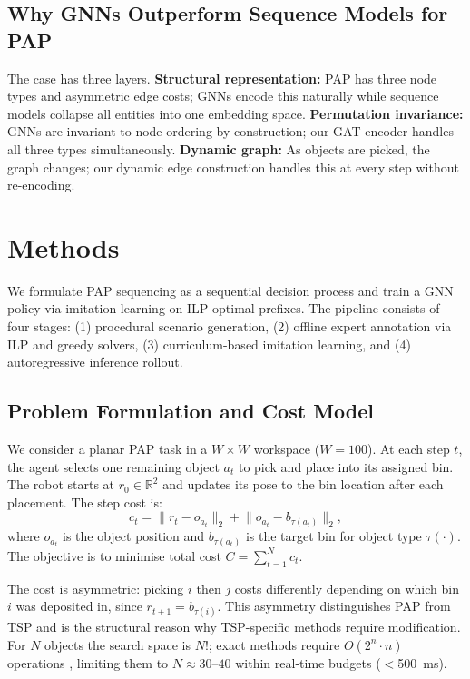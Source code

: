 \documentclass[conference]{IEEEtran}
\begin{document}
\subsection{Why GNNs Outperform Sequence Models for PAP}

The case has three layers. \textbf{Structural representation:} PAP has three node types and asymmetric edge costs; GNNs encode this naturally while sequence models collapse all entities into one embedding space. \textbf{Permutation invariance:} GNNs are invariant to node ordering by construction; our GAT encoder handles all three types simultaneously. \textbf{Dynamic graph:} As objects are picked, the graph changes; our dynamic edge construction handles this at every step without re-encoding.

\section{Methods}\label{sec:methods}

We formulate PAP sequencing as a sequential decision process and train a GNN policy via imitation learning on ILP-optimal prefixes. The pipeline consists of four stages: (1) procedural scenario generation, (2) offline expert annotation via ILP and greedy solvers, (3) curriculum-based imitation learning, and (4) autoregressive inference rollout.

\subsection{Problem Formulation and Cost Model}

We consider a planar PAP task in a $W \times W$ workspace ($W=100$). At each step $t$, the agent selects one remaining object $a_t$ to pick and place into its assigned bin. The robot starts at $r_0 \in \mathbb{R}^2$ and updates its pose to the bin location after each placement. The step cost is:
\begin{equation}
c_t = \lVert r_t - o_{a_t} \rVert_2 + \lVert o_{a_t} - b_{\tau(a_t)} \rVert_2,
\end{equation}
where $o_{a_t}$ is the object position and $b_{\tau(a_t)}$ is the target bin for object type $\tau(\cdot)$. The objective is to minimise total cost $C = \sum_{t=1}^{N} c_t$.

The cost is asymmetric: picking $i$ then $j$ costs differently depending on which bin $i$ was deposited in, since $r_{t+1} = b_{\tau(i)}$. This asymmetry distinguishes PAP from TSP and is the structural reason why TSP-specific methods require modification. For $N$ objects the search space is $N!$; exact methods require $O(2^n \cdot n)$ operations \cite{han2019pap}, limiting them to $N \approx 30$--$40$ within real-time budgets ($<$500~ms).
\end{document}
